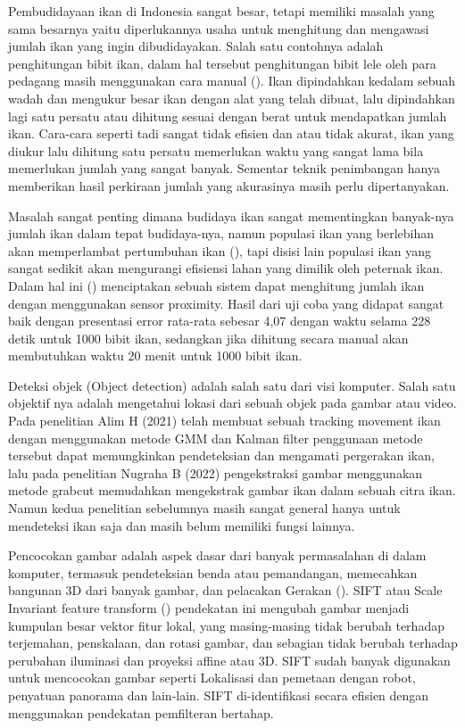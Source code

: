 Pembudidayaan ikan di Indonesia sangat besar, tetapi memiliki masalah yang sama besarnya yaitu diperlukannya usaha 
untuk menghitung dan mengawasi jumlah ikan yang ingin dibudidayakan. Salah satu contohnya adalah penghitungan bibit ikan, 
dalam hal tersebut penghitungan bibit lele oleh para pedagang masih menggunakan cara manual (\cite{Amri2020}). 
Ikan dipindahkan kedalam sebuah wadah dan mengukur besar ikan dengan alat yang telah dibuat, lalu dipindahkan lagi satu persatu 
atau dihitung sesuai dengan berat untuk mendapatkan jumlah ikan. Cara-cara seperti tadi sangat tidak efisien dan atau tidak akurat, 
ikan yang diukur lalu dihitung satu persatu memerlukan waktu yang sangat lama bila memerlukan jumlah yang sangat banyak. 
Sementar teknik penimbangan hanya memberikan hasil perkiraan jumlah yang akurasinya masih perlu dipertanyakan. 

Masalah sangat penting dimana budidaya ikan sangat mementingkan banyak-nya jumlah ikan dalam tepat budidaya-nya, 
namun populasi ikan yang berlebihan akan memperlambat pertumbuhan ikan (\cite{Diansari2013}), 
tapi disisi lain populasi ikan yang sangat sedikit akan mengurangi efisiensi lahan yang dimilik oleh peternak ikan. 
Dalam hal ini (\cite{Amri2020}) menciptakan sebuah sistem dapat menghitung jumlah ikan dengan menggunakan sensor proximity. 
Hasil dari uji coba yang didapat sangat baik dengan presentasi error rata-rata sebesar 4,07 dengan waktu selama 228 detik untuk 1000 bibit ikan, 
sedangkan jika dihitung secara manual akan membutuhkan waktu 20 menit untuk 1000 bibit ikan. 

Deteksi objek (Object detection) adalah salah satu dari visi komputer. Salah satu objektif nya adalah mengetahui lokasi dari sebuah objek pada gambar atau video. 
Pada penelitian Alim H (2021) telah membuat sebuah tracking movement ikan dengan menggunakan metode GMM dan Kalman filter penggunaan metode tersebut dapat memungkinkan 
pendeteksian dan mengamati pergerakan ikan, lalu pada penelitian Nugraha B (2022) pengekstraksi gambar menggunakan metode grabcut memudahkan mengekstrak gambar ikan dalam sebuah citra ikan. 
Namun kedua penelitian sebelumnya masih sangat general hanya untuk mendeteksi ikan saja dan masih belum memiliki fungsi lainnya. 

Pencocokan gambar adalah aspek dasar dari banyak permasalahan di dalam komputer, termasuk  pendeteksian benda atau pemandangan, memecahkan bangunan 3D dari banyak gambar, 
dan pelacakan Gerakan (\cite{Lowe2004}). SIFT atau Scale Invariant feature transform (\cite{Lowe1999}) pendekatan ini mengubah gambar menjadi kumpulan besar vektor fitur lokal, 
yang masing-masing tidak berubah terhadap terjemahan, penskalaan, dan rotasi gambar, dan sebagian tidak berubah terhadap perubahan iluminasi 
dan proyeksi affine atau 3D. SIFT sudah banyak digunakan untuk mencocokan gambar seperti Lokalisasi dan pemetaan dengan robot, penyatuan panorama dan lain-lain. 
SIFT di-identifikasi secara efisien dengan menggunakan pendekatan pemfilteran bertahap. 

